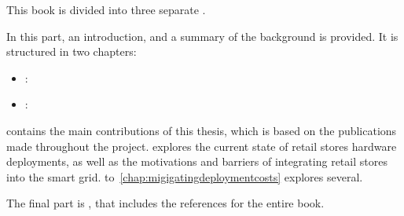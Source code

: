 

This book is divided into three separate .

In this part, an introduction, and a summary of the background is provided.
It is structured in two chapters:
\begin{itemize}
    \item {}: 
    \item {}: 
\end{itemize}

 contains the main contributions of this thesis, which is based on the publications made throughout the \phd project.
 explores the current state of retail stores hardware deployments, as well as the motivations and barriers of integrating retail stores into the smart grid.
 to~\ref{chap:migigatingdeploymentcosts} explores several.


The final part is , that includes the references for the entire book.
